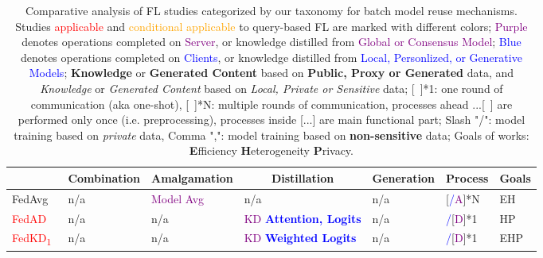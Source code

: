 \begin{table}[htp]
  \centering
  \scriptsize
  \caption{Comparative analysis of FL studies categorized by our taxonomy for batch model reuse mechanisms.
  Studies \textcolor{red}{applicable} and \textcolor{orange}{conditional applicable} to query-based FL are marked with different colors;
  \textcolor{purple}{Purple} denotes operations completed on \textcolor{purple}{Server}, or knowledge distilled from \textcolor{purple}{Global or Consensus Model}; 
  \textcolor{blue}{Blue} denotes operations completed on \textcolor{blue}{Clients}, or knowledge distilled from \textcolor{blue}{Local, Personlized, or Generative Models}; 
  \textbf{Knowledge} or \textbf{Generated Content} based on \textbf{Public, Proxy or Generated} data, and \textit{Knowledge} or \textit{Generated Content} based on \textit{Local, Private or Sensitive} data;
  [~]*1: one round of communication (aka one-shot), [~]*N: multiple rounds of communication, processes ahead ...[~] are performed only once (i.e. preprocessing), processes inside [...] are main functional part; Slash "/": model training based on \textit{private} data, Comma ",": model training based on \textbf{non-sensitive} data; Goals of works: \textbf{E}fficiency \textbf{H}eterogeneity \textbf{P}rivacy.}
  \label{tab:flreuse}
  \begin{tabular}{|p{2.05cm}|p{1.36cm}|p{1.56cm}|p{4.35cm}|p{2.77cm}|p{1.5cm}|p{0.35cm}|}
    \hline
    \rowcolor[gray]{.8}
    \multicolumn{1}{|c|}{FL Studies} & \multicolumn{1}{c|}{\textbf{C}ombination} & \multicolumn{1}{c|}{\textbf{A}malgamation} & \multicolumn{1}{c|}{\textbf{D}istillation} & \multicolumn{1}{c|}{\textbf{G}eneration} & \multicolumn{1}{c|}{Process}& \multicolumn{1}{c|}{Goals} \\ \hline
    FedAvg~\cite{mcmahan2017communication} & n/a &  \textcolor{purple}{Model Avg}  & n/a & n/a & [\textcolor{blue}{/}\textcolor{purple}{A}]*N & EH   \\ \hline

    \rowcolor[gray]{.9}
    \textcolor{red}{FedAD}~\cite{gong2021ensemble} & n/a & n/a & \textcolor{purple}{KD} \textcolor{blue}{\textbf{Attention, Logits}}  & n/a & \textcolor{blue}{/}[\textcolor{purple}{D}]*1 & HP \\ \hline %
  
    \textcolor{red}{FedKD\textsubscript{1}}~\cite{gong2022preserving} & n/a & n/a & \textcolor{purple}{KD} \textcolor{blue}{\textbf{Weighted Logits}} & n/a &\textcolor{blue}{/}[\textcolor{purple}{D}]*1 & EHP \\ \hline %


\end{tabular}
\end{table}
